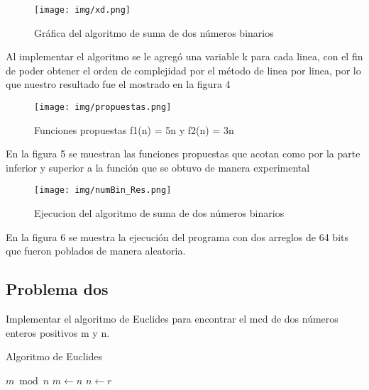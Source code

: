 \documentclass[12pt,twoside]{article}
\begin{document}
\vspace{10 mm}
\begin{figure}[h]
\centering
\texttt{[image: img/xd.png]}
\caption{Gráfica del algoritmo de suma de dos números binarios}
\label{ejecucionEuclides}
\end{figure}
\vspace{8 mm}
Al implementar el algoritmo se le agregó una variable k para cada linea, con el fin de poder obtener el orden de complejidad por el método de linea por linea, por lo que nuestro resultado fue el mostrado en la figura 4
\vspace{10 mm}
\begin{figure}[H]
\centering
\texttt{[image: img/propuestas.png]}
\caption{Funciones propuestas f1(n) = 5n y f2(n) = 3n}
\label{ejecucionEuclides}
\end{figure}

En la figura 5 se muestran las funciones propuestas que acotan como por la parte inferior y superior a la función que se obtuvo de manera experimental
\vspace{10 mm}

\begin{figure}[H]
\centering
\texttt{[image: img/numBin\_Res.png]}
\caption{Ejecucion del algoritmo de suma de dos números binarios}
\label{ejecucionEuclides}
\end{figure}
\vspace{5 mm}
En la figura 6 se muestra la ejecución del programa con dos arreglos de 64 bits que fueron poblados de manera aleatoria.
\subsection*{Problema dos}
Implementar el algoritmo de Euclides para encontrar el mcd de dos números enteros
positivos m y n.
\vspace{5 mm}
\begin{algorithm}
    \caption{Algoritmo de Euclides}
    \label{euclides}
    \begin{algorithmic}[1]
            \State $m  \bmod n$
			\State $m\gets n$
             \State $n\gets r$
            \EndWhile
        \EndProcedure
    \end{algorithmic}
\end{algorithm}
\vspace{10 mm}
\end{document}
